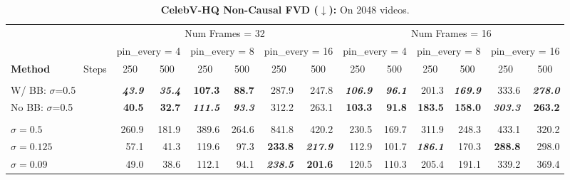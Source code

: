 
\begin{table}[htbp]
\centering\tiny
\caption{\textbf{CelebV-HQ Non-Causal FVD ($\downarrow$):} On 2048 videos.}
\label{tab:celebvhq_NON_causal_fvd}
\begin{tabular}{lrrrrrrrrrrrr}
\toprule
 & \multicolumn{6}{c}{Num Frames = 32} & \multicolumn{6}{c}{Num Frames = 16} \\
\cmidrule(lr){2-7} \cmidrule(lr){8-13}
 & \multicolumn{2}{c}{pin\_every = 4} & \multicolumn{2}{c}{pin\_every = 8} & \multicolumn{2}{c}{pin\_every = 16} & \multicolumn{2}{c}{pin\_every = 4} & \multicolumn{2}{c}{pin\_every = 8} & \multicolumn{2}{c}{pin\_every = 16} \\
\cmidrule(lr){2-3} \cmidrule(lr){4-5} \cmidrule(lr){6-7} \cmidrule(lr){8-9} \cmidrule(lr){10-11} \cmidrule(lr){12-13}
\textbf{Method} \ \ \ \ \ \ Steps & \multicolumn{1}{c}{250} & \multicolumn{1}{c}{500} & \multicolumn{1}{c}{250} & \multicolumn{1}{c}{500} & \multicolumn{1}{c}{250} & \multicolumn{1}{c}{500} & \multicolumn{1}{c}{250} & \multicolumn{1}{c}{500} & \multicolumn{1}{c}{250} & \multicolumn{1}{c}{500} & \multicolumn{1}{c}{250} & \multicolumn{1}{c}{500} \\
\midrule
\rowcolor{gray!20} \multicolumn{13}{l}{\textit{ABC}} \\
\quad W/ BB: $\sigma$=0.5 & \textbf{\textit{43.9}} & \textbf{\textit{35.4}} & \textbf{107.3} & \textbf{88.7} & 287.9 & 247.8 & \textbf{\textit{106.9}} & \textbf{\textit{96.1}} & 201.3 & \textbf{\textit{169.9}} & 333.6 & \textbf{\textit{278.0}} \\
\quad No BB: $\sigma$=0.5 & \textbf{40.5} & \textbf{32.7} & \textbf{\textit{111.5}} & \textbf{\textit{93.3}} & 312.2 & 263.1 & \textbf{103.3} & \textbf{91.8} & \textbf{183.5} & \textbf{158.0} & \textbf{\textit{303.3}} & \textbf{263.2} \\
\rowcolor{gray!20} \multicolumn{13}{l}{\textit{Conditional Diffusion Bridge ($\approx$ DDBM \cite{zhou2023denoising}, PFI \cite{chen2024probabilistic})}} \\
\quad $\sigma=0.5$ & 260.9 & 181.9 & 389.6 & 264.6 & 841.8 & 420.2 & 230.5 & 169.7 & 311.9 & 248.3 & 433.1 & 320.2 \\
\quad $\sigma=0.125$ & 57.1 & 41.3 & 119.6 & 97.3 & \textbf{233.8} & \textbf{\textit{217.9}} & 112.9 & 101.7 & \textbf{\textit{186.1}} & 170.3 & \textbf{288.8} & 298.0 \\
\quad $\sigma=0.09$ & 49.0 & 38.6 & 112.1 & 94.1 & \textbf{\textit{238.5}} & \textbf{201.6} & 120.5 & 110.3 & 205.4 & 191.1 & 339.2 & 369.4 \\

\end{tabular}
\end{table}

